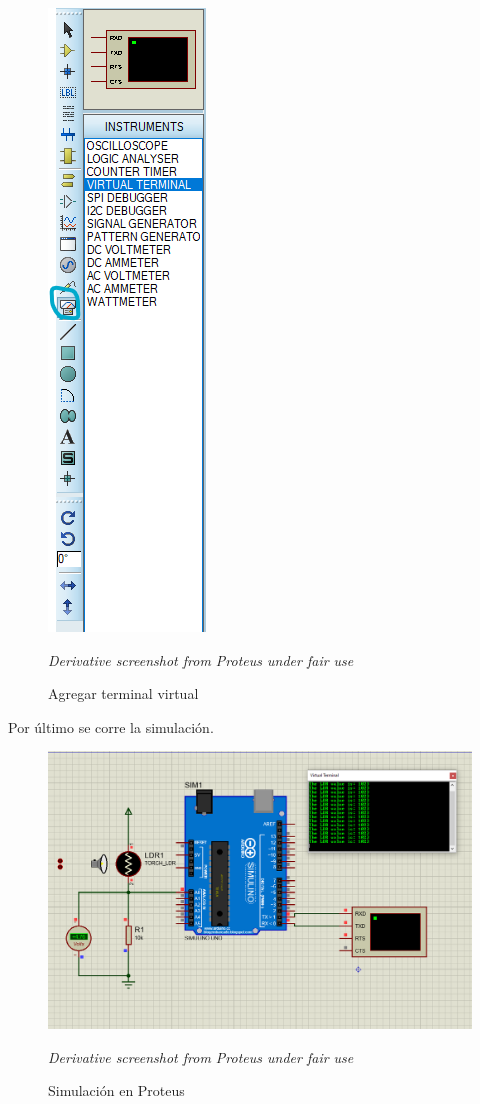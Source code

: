 \documentclass{article}
\begin{document}
\begin{figure}[H]
\centering
\includegraphics[width=0.1\paperwidth]{images/proteus-virtual-terminal}
\caption{Agregar terminal virtual}\footnotesize
\textit{Derivative screenshot from Proteus under fair use}
\end{figure}

Por último se corre la simulación.

\begin{figure}[H]
\centering
\includegraphics[width=0.3\paperwidth]{images/sim-1}
\caption{Simulación en Proteus}\footnotesize
\textit{Derivative screenshot from Proteus under fair use}
\end{figure}
\end{document}
